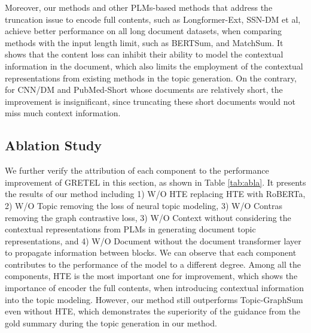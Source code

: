 \documentclass[11pt]{article}
\begin{document}
Moreover, our methods and other PLMs-based methods that address the truncation issue to encode full contents, such as Longformer-Ext, SSN-DM et al, achieve better performance on all long document datasets, when comparing methods with the input length limit, such as BERTSum, and MatchSum.
It shows that the content loss can inhibit their ability to model the contextual information in the document, which also limits the employment of the contextual representations from existing methods in the topic generation.
On the contrary, for CNN/DM and PubMed-Short whose documents are relatively short, the improvement is insignificant, since truncating these short documents would not miss much context information.
\begin{table}[!hbt]
\scriptsize
    \centering
\caption{ROUGE F1 results of our model under different settings on PubMed-Long and Arxiv.}
    \label{tab:abla}
\end{table}




\subsection{Ablation Study} 
We further verify the attribution of each component to the performance improvement of GRETEL in this section, as shown in Table \ref{tab:abla}.
It presents the results of our method including 1) W/O HTE replacing HTE with RoBERTa, 
2) W/O Topic removing the loss of neural topic modeling, 3) W/O Contras removing the graph contrastive loss, 3) W/O Context without considering the contextual representations from PLMs in generating document topic representations, and
4) W/O Document without the document transformer layer to propagate information between blocks.
We can observe that each component contributes to the performance of the model to a different degree.
Among all the components, HTE is the most important one for improvement, which shows the importance of encoder the full contents, when introducing contextual information into the topic modeling.
However, our method still outperforms Topic-GraphSum even without HTE, which demonstrates the superiority of the guidance from the gold summary during the topic generation in our method.
\end{document}
